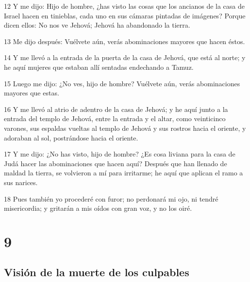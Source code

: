 \par 12 Y me dijo: Hijo de hombre, ¿has visto las cosas que los ancianos de la casa de Israel hacen en tinieblas, cada uno en sus cámaras pintadas de imágenes? Porque dicen ellos: No nos ve Jehová; Jehová ha abandonado la tierra.
\par 13 Me dijo después: Vuélvete aún, verás abominaciones mayores que hacen éstos.
\par 14 Y me llevó a la entrada de la puerta de la casa de Jehová, que está al norte; y he aquí mujeres que estaban allí sentadas endechando a Tamuz.
\par 15 Luego me dijo: ¿No ves, hijo de hombre? Vuélvete aún, verás abominaciones mayores que estas.
\par 16 Y me llevó al atrio de adentro de la casa de Jehová; y he aquí junto a la entrada del templo de Jehová, entre la entrada y el altar, como veinticinco varones, sus espaldas vueltas al templo de Jehová y sus rostros hacia el oriente, y adoraban al sol, postrándose hacia el oriente.
\par 17 Y me dijo: ¿No has visto, hijo de hombre? ¿Es cosa liviana para la casa de Judá hacer las abominaciones que hacen aquí? Después que han llenado de maldad la tierra, se volvieron a mí para irritarme; he aquí que aplican el ramo a sus narices.
\par 18 Pues también yo procederé con furor; no perdonará mi ojo, ni tendré misericordia; y gritarán a mis oídos con gran voz, y no los oiré.

\chapter{9}

\section*{Visión de la muerte de los culpables}


